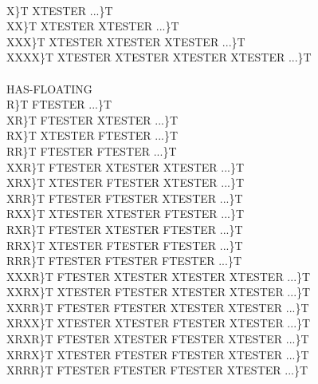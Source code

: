\begin{tt}
\\
\word{:} X\}T    XTESTER                         ...\}T \word{;} \\
\word{:} XX\}T   XTESTER XTESTER                 ...\}T \word{;} \\
\word{:} XXX\}T  XTESTER XTESTER XTESTER         ...\}T \word{;} \\
\word{:} XXXX\}T XTESTER XTESTER XTESTER XTESTER ...\}T \word{;} \\
\\
HAS-FLOATING \word[tools]{[IF]} \\
\tab \word{:} R\}T    FTESTER                         ...\}T \word{;} \\
\tab \word{:} XR\}T   FTESTER XTESTER                 ...\}T \word{;} \\
\tab \word{:} RX\}T   XTESTER FTESTER                 ...\}T \word{;} \\
\tab \word{:} RR\}T   FTESTER FTESTER                 ...\}T \word{;} \\
\tab \word{:} XXR\}T  FTESTER XTESTER XTESTER         ...\}T \word{;} \\
\tab \word{:} XRX\}T  XTESTER FTESTER XTESTER         ...\}T \word{;} \\
\tab \word{:} XRR\}T  FTESTER FTESTER XTESTER         ...\}T \word{;} \\
\tab \word{:} RXX\}T  XTESTER XTESTER FTESTER         ...\}T \word{;} \\
\tab \word{:} RXR\}T  FTESTER XTESTER FTESTER         ...\}T \word{;} \\
\tab \word{:} RRX\}T  XTESTER FTESTER FTESTER         ...\}T \word{;} \\
\tab \word{:} RRR\}T  FTESTER FTESTER FTESTER         ...\}T \word{;} \\
\tab \word{:} XXXR\}T FTESTER XTESTER XTESTER XTESTER ...\}T \word{;} \\
\tab \word{:} XXRX\}T XTESTER FTESTER XTESTER XTESTER ...\}T \word{;} \\
\tab \word{:} XXRR\}T FTESTER FTESTER XTESTER XTESTER ...\}T \word{;} \\
\tab \word{:} XRXX\}T XTESTER XTESTER FTESTER XTESTER ...\}T \word{;} \\
\tab \word{:} XRXR\}T FTESTER XTESTER FTESTER XTESTER ...\}T \word{;} \\
\tab \word{:} XRRX\}T XTESTER FTESTER FTESTER XTESTER ...\}T \word{;} \\
\tab \word{:} XRRR\}T FTESTER FTESTER FTESTER XTESTER ...\}T \word{;} \\

\end{tt}
